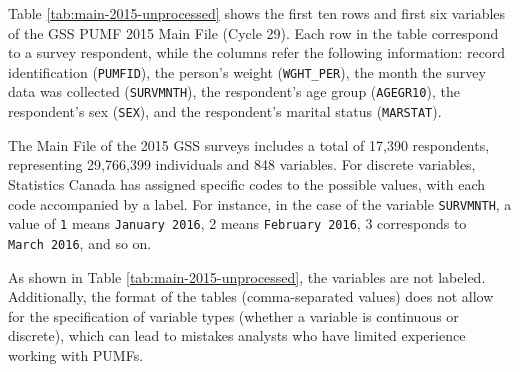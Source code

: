 \documentclass[Royal,times,sageh]{sagej}
\begin{document}
Table \ref{tab:main-2015-unprocessed} shows the first ten rows and first
six variables of the GSS PUMF 2015 Main File (Cycle 29). Each row in the
table correspond to a survey respondent, while the columns refer the
following information: record identification (\texttt{PUMFID}), the
person's weight (\texttt{WGHT\_PER}), the month the survey data was
collected (\texttt{SURVMNTH}), the respondent's age group
(\texttt{AGEGR10}), the respondent's sex (\texttt{SEX}), and the
respondent's marital status (\texttt{MARSTAT}).

The Main File of the 2015 GSS surveys includes a total of 17,390
respondents, representing 29,766,399 individuals and 848 variables. For
discrete variables, Statistics Canada has assigned specific codes to the
possible values, with each code accompanied by a label. For instance, in
the case of the variable \texttt{SURVMNTH}, a value of \texttt{1} means
\texttt{January\ 2016}, 2 means \texttt{February\ 2016}, 3 corresponds
to \texttt{March\ 2016}, and so on.

As shown in Table \ref{tab:main-2015-unprocessed}, the variables are not
labeled. Additionally, the format of the tables (comma-separated values)
does not allow for the specification of variable types (whether a
variable is continuous or discrete), which can lead to mistakes analysts
who have limited experience working with PUMFs.

\begingroup\fontsize{8}{10}\selectfont
\end{document}
